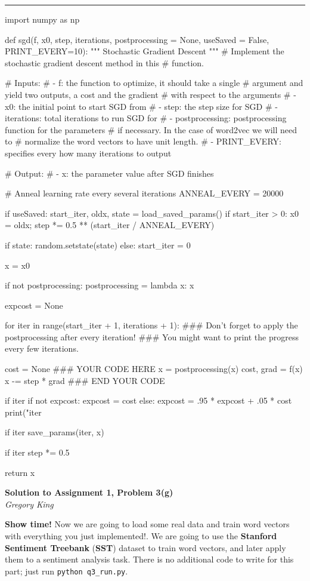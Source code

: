 \documentclass[letter,12pt]{article}
\newcommand{\myhwtitle}[3]
{\begin{center}
{\large {\bf Solution to Assignment {#1}, Problem {#2}}}\\
\medskip
{\it {#3}} %
\end{center}}
\newcommand{\solutionsAuthor}{Gregory King}
\begin{document}
\noindent\rule{\textwidth}{0.4pt}\vspace{5mm}
\begin{python}
import numpy as np

def sgd(f, x0, step, iterations,
           postprocessing = None,
           useSaved = False,
           PRINT_EVERY=10):
    """ Stochastic Gradient Descent """
    # Implement the stochastic gradient descent method in this
    # function.

    # Inputs:
    # - f: the function to optimize, it should take a single
    #     argument and yield two outputs, a cost and the gradient
    #     with respect to the arguments
    # - x0: the initial point to start SGD from
    # - step: the step size for SGD
    # - iterations: total iterations to run SGD for
    # - postprocessing: postprocessing function for the parameters
    #     if necessary. In the case of word2vec we will need to
    #     normalize the word vectors to have unit length.
    # - PRINT_EVERY: specifies every how many iterations to output

    # Output:
    # - x: the parameter value after SGD finishes

    # Anneal learning rate every several iterations
    ANNEAL_EVERY = 20000

    if useSaved:
        start_iter, oldx, state = load_saved_params()
        if start_iter > 0:
            x0 = oldx;
            step *= 0.5 ** (start_iter / ANNEAL_EVERY)

        if state:
            random.setstate(state)
    else:
        start_iter = 0

    x = x0

    if not postprocessing:
        postprocessing = lambda x: x

    expcost = None

    for iter in range(start_iter + 1, iterations + 1):
        ### Don't forget to apply the postprocessing after every iteration!
        ### You might want to print the progress every few iterations.

        cost = None
        ### YOUR CODE HERE
        x = postprocessing(x)
        cost, grad = f(x)
        x -= step * grad
        ### END YOUR CODE

        if iter %
            if not expcost:
                expcost = cost
            else:
                expcost = .95 * expcost + .05 * cost
            print("iter %

        if iter %
            save_params(iter, x)

        if iter %
            step *= 0.5

    return x
\end{python}
\clearpage
\myhwtitle{1}{3(g)}{\solutionsAuthor}
\bigskip
\noindent \textbf{Show time!} Now we are going to load some real data and train word vectors with everything you just implemented!. We are going to use
the \textbf{Stanford Sentiment Treebank} (\textbf{SST}) dataset to train word vectors, and later apply them to a sentiment analysis task. There is no additional code to write
for this part; just run \texttt{python q3\_run.py}.
\end{document}
